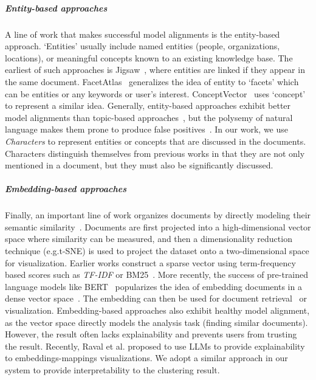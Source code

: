 \vspace*{-0.2cm}
\subparagraph{Entity-based approaches}
A line of work that makes successful model alignments is the entity-based approach.
`Entities' usually include named entities (people, organizations, locations), or meaningful concepts known to an existing knowledge base.
The earliest of such approaches is Jigsaw~\cite{Stasko2007jigasw}, where entities are linked if they appear in the same document.
FacetAtlas~\cite{cao2010facetatlas} generalizes the idea of entity to `facets' which can be entities or any keywords or user's interest.
ConceptVector~\cite{park2018conceptvector} uses `concept' to represent a similar idea. 
Generally, entity-based approaches exhibit better model alignments than topic-based approaches~\cite{chuang2012interpretation}, 
but the polysemy of natural language makes them prone to produce false positives~\cite{park2018conceptvector}.
In our work, we use \textit{Characters} to represent entities or concepts that are discussed in the documents.
Characters distinguish themselves from previous works in that they are not only mentioned in a document, but they must also be significantly discussed.

\vspace*{-0.2cm}
\subparagraph{Embedding-based approaches}
Finally, an important line of work organizes documents by directly modeling their semantic similarity~\cite{steinbach2000doccluster}.
Documents are first projected into a high-dimensional vector space where similarity can be measured, and then a dimensionality reduction technique (e.g.t-SNE) is used to project the dataset onto a two-dimensional space for visualization.
Earlier works construct a sparse vector using term-frequency based scores such as \textit{TF-IDF} or BM25~\cite{choo2013utopian,sherkat2018interactive}.
More recently, the success of pre-trained language models like BERT~\cite{devlin2018bert} popularizes the idea of embedding documents in a dense vector space~\cite{narechania2022vitality,tu2023sdrquerier,qiu2022docflow}.
The embedding can then be used for document retrieval~\cite{karpukhin-etal-2020-dense, izacard2022unsupervised} or visualization.
Embedding-based approaches also exhibit healthy model alignment, as the vector space directly models the analysis task (finding similar documents). 
However, the result often lacks explainability and prevents users from trusting the result.
Recently, Raval et al.\cite{raval2023explainandtrust} proposed to use LLMs to provide explainability to embeddings-mappings visualizations.
We adopt a similar approach in our system to provide interpretability to the clustering result.

